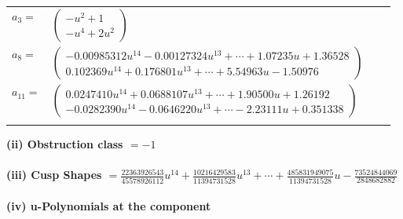 \documentclass[1p]{elsarticle_modified}
\theoremstyle{definition}
\begin{document}
\begin{tabular}{m{7pt} m{180pt} m{7pt} m{180pt} }
\flushright $a_{3}=$&$\begin{pmatrix}- u^2+1\\- u^4+2 u^2\end{pmatrix}$ \\
\flushright $a_{8}=$&$\begin{pmatrix}-0.00985312 u^{14}-0.00127324 u^{13}+\cdots+1.07235 u+1.36528\\0.102369 u^{14}+0.176801 u^{13}+\cdots+5.54963 u-1.50976\end{pmatrix}$ \\
\flushright $a_{11}=$&$\begin{pmatrix}0.0247410 u^{14}+0.0688107 u^{13}+\cdots+1.90500 u+1.26192\\-0.0282390 u^{14}-0.0646220 u^{13}+\cdots-2.23111 u+0.351338\end{pmatrix}$\\&\end{tabular}
\flushleft \textbf{(ii) Obstruction class $= -1$}\\~\\
\flushleft \textbf{(iii) Cusp Shapes $= \frac{22363926543}{45578926112} u^{14}+\frac{10216429583}{11394731528} u^{13}+\cdots+\frac{485831949075}{11394731528} u-\frac{73524844069}{2848682882}$}\\~\\
\newpage\renewcommand{\arraystretch}{1}
\flushleft \textbf{(iv) u-Polynomials at the component}\newline \\
\end{document}
